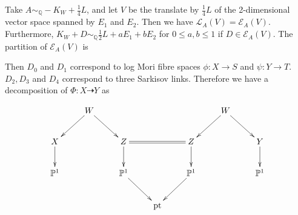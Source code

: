 \documentclass[11pt]{amsart}
\begin{document}
Take $A\sim_{\mathbb{Q}}-K_{W}+\frac{1}{4}L$, and let $V$ be the translate by  $\frac{1}{4}L$ of the 2-dimensional vector space spanned by $E_{1}$ and  $E_{2}$. Then we have $\mathcal{L}_{A}(V)=\mathcal{E}_{A}(V)$. Furthermore,  $K_{W}+D\sim_{\mathbb{Q}} \frac{1}{2}L+aE_{1}+bE_{2}$ for $0\leqslant a,b\leqslant 1$ if $D \in \mathcal{E}_{A}(V)$. The partition of $\mathcal{E}_{A}(V)$ is
\begin{center}
\end{center}
Then $D_{0}$ and $D_{1}$ correspond to log Mori fibre spaces $\phi:X\to S$ and $\psi:Y\to T$. $D_{2},D_{3}$ and $D_{4}$ correspond to three Sarkisov links. Therefore we have a decomposition of $\Phi:X\dashrightarrow  Y$ as

\[
  \xymatrix{
     &W\ar[ld]\ar[rd] &&&&W\ar[ld]\ar[rd] \\
    X\ar[d]& &Z\ar[d]\ar@{=}[rr]&&Z\ar[d]&&Y\ar[d]\\
    \mathbb{P}^{1}&&\mathbb{P}^{1}\ar[dr]&&\mathbb{P}^{1}\ar[dl]&&\mathbb{P}^{1}\\
                  &&&\text{pt} 
  }
\]
\end{document}
